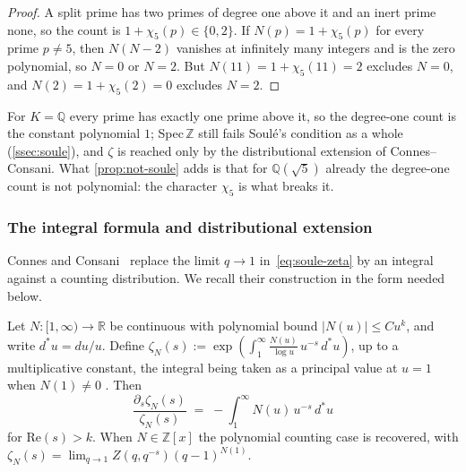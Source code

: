 \begin{proof}
A split prime has two primes of degree one above it and an inert prime none, so the
count is $1+\chi_5(p)\in\{0,2\}$.  If $N(p)=1+\chi_5(p)$ for every prime $p\ne5$, then
$N(N-2)$ vanishes at infinitely many integers and is the zero polynomial, so $N=0$ or
$N=2$.  But $N(11)=1+\chi_5(11)=2$ excludes $N=0$, and $N(2)=1+\chi_5(2)=0$ excludes
$N=2$.
\end{proof}

\begin{remark}\label{rmk:trivial-cases}
For $K=\mathbb{Q}$ every prime has exactly one prime above it, so the
degree-one count is the constant polynomial $1$; Spec\,$\mathbb Z$ still fails Soul\'e's
condition as a whole (\cref{ssec:soule}), and $\zeta$ is reached only by the
distributional extension of Connes--Consani.  What \cref{prop:not-soule} adds is that
for $\mathbb{Q}(\sqrt5)$ already the degree-one count is not polynomial: the character
$\chi_5$ is what breaks it.
\end{remark}

\subsubsection{The integral formula and distributional extension}
\label{ssec:integral-formula}

Connes and Consani~\cite{connesconsani10} replace the limit
$q\to 1$ in~\eqref{eq:soule-zeta} by an integral against a
counting distribution.  We recall their construction in the form
needed below.

\begin{lemma}
\label{lem:cc-integral}
Let $N\colon[1,\infty)\to\mathbb{R}$ be continuous with polynomial
bound $|N(u)|\le Cu^k$, and write $d^*u=du/u$.  Define
$\zeta_N(s) := \exp\!\left(\int_1^\infty
\frac{N(u)}{\log u}\,u^{-s}\,d^*u\right)$, up to a multiplicative constant, the integral being taken as a principal
value at $u=1$ when $N(1)\neq0$ \cite[Eqs.~(9)--(10)]{connesconsani10}.  Then
\begin{equation}\label{eq:cc-integral}
  \frac{\partial_s\zeta_N(s)}{\zeta_N(s)} \;=\;
  -\int_1^\infty N(u)\,u^{-s}\,d^*u
\end{equation}
for $\mathrm{Re}(s)>k$.  When $N\in\mathbb{Z}[x]$
the polynomial counting case is recovered, with
$\zeta_N(s) = \lim_{q\to 1}Z(q,q^{-s})(q-1)^{N(1)}$.
\end{lemma}

